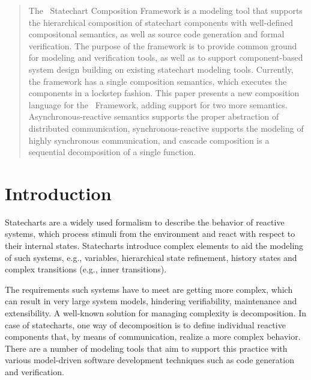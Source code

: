 \begin{abstract}

The \gamma\ Statechart Composition Framework is a modeling tool that supports the hierarchical composition of statechart components with well-defined compositonal semantics, as well as source code generation and formal verification. The purpose of the framework is to provide common ground for modeling and verification tools, as well as to support component-based system design building on existing statechart modeling tools. Currently, the framework has a single composition semantics, which executes the components in a lockstep fashion. This paper presents a new composition language for the \gamma\ Framework, adding support for two more semantics. Asynchronous-reactive semantics supports the proper abstraction of distributed communication, synchronous-reactive supports the modeling of highly synchronous communication, and cascade composition is a sequential decomposition of a single function. 
\end{abstract}
%
\IEEEpeerreviewmaketitle

\section{Introduction}
\label{sec:introduction}
Statecharts \cite{Harel:1987:SVF:34884.34886} are a widely used formalism to describe the behavior of reactive systems, which process stimuli from the environment and react with respect to their internal states. Statecharts introduce complex elements to aid the modeling of such systems, e.g., variables, hierarchical state refinement, history states and complex transitions (e.g., inner transitions).

The requirements such systems have to meet are getting more complex, which can result in very large system models, hindering verifiability, maintenance and extensibility. A well-known solution for managing complexity is decomposition. In case of statecharts, one way of decomposition is to define individual reactive components that, by means of communication, realize a more complex behavior. There are a number of modeling tools that aim to support this practice with various model-driven software development techniques such as code generation and verification.

